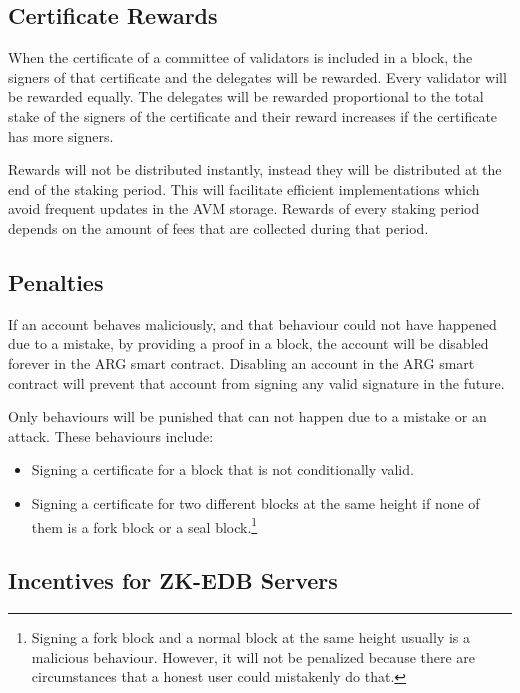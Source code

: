 

\subsection{Certificate Rewards}\label{subsec:rewards}

When the certificate of a committee of validators is included in a block, the signers of that certificate and the
delegates will be rewarded. Every validator will be rewarded equally. The delegates will be rewarded
proportional to the total stake of the signers of the certificate and their reward increases if the
certificate has more signers.

Rewards will not be distributed instantly, instead they will be distributed at the end of the staking period.
This will facilitate efficient implementations which avoid frequent updates in the AVM storage.
Rewards of every staking period depends on the amount of fees that are collected during that period.

\subsection{Penalties}\label{subsec:penalties}

If an account behaves maliciously, and that behaviour could not have happened due to a mistake, by providing a proof
in a block, the account will be disabled forever in the ARG smart contract. Disabling an account in the
ARG smart contract will prevent that account from signing any valid signature in the future.

Only behaviours will be punished that can not happen due to a mistake or an attack. These behaviours include:
\begin{itemize}
    \item Signing a certificate for a block that is not conditionally valid.
    \item Signing a certificate for two different blocks at the same height if none of them
    is a fork block or a seal block.\footnote{Signing
    a fork block and a normal block at the same height usually is a malicious behaviour. However, it will not be
    penalized because there are circumstances that a honest user could mistakenly do that.}
\end{itemize}

\subsection{Incentives for ZK-EDB Servers}\label{subsec:zk-edb-servers}

